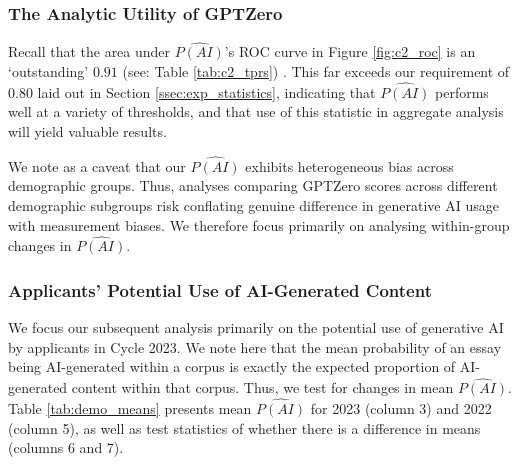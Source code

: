 \subsubsection{The Analytic Utility of GPTZero}
Recall that the area under $\widehat{P(AI)}$'s ROC curve in Figure \ref{fig:c2_roc} is an `outstanding' $0.91$ (see: Table \ref{tab:c2_tprs}) \cite{mandrekar_receiver_2010}. This far exceeds our requirement of $0.80$ laid out in Section \ref{ssec:exp_statistics}, indicating that $\widehat{P(AI)}$ performs well at a variety of thresholds, and that use of this statistic in aggregate analysis will yield valuable results. 

We note as a caveat that our $\widehat{P(AI)}$ exhibits heterogeneous bias across demographic groups. Thus, analyses comparing GPTZero scores across different demographic subgroups risk conflating genuine difference in generative AI usage with measurement biases. We therefore focus primarily on analysing within-group changes in $\widehat{P(AI)}$.

\subsubsection{Applicants' Potential Use of AI-Generated Content}
We focus our subsequent analysis primarily on the potential use of generative AI by applicants in Cycle 2023. We note here that the mean probability of an essay being AI-generated within a corpus is exactly the expected proportion of AI-generated content within that corpus. Thus, we test for changes in mean $\widehat{P(AI)}$. Table \ref{tab:demo_means} presents mean $\widehat{P(AI)}$ for 2023 (column 3) and 2022 (column 5), as well as test statistics of whether there is a difference in means (columns 6 and 7).

